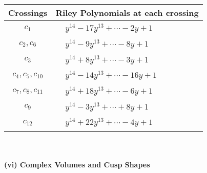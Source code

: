 \documentclass[1p]{elsarticle_modified}
\theoremstyle{definition}
\begin{document}
\begin{tabular}{m{50pt}|m{274pt}}
Crossings & \hspace{64pt}Riley Polynomials at each crossing \\
\hline $$\begin{aligned}c_{1}\end{aligned}$$&$\begin{aligned}
&y^{14}-17 y^{13}+\cdots-2 y+1
\end{aligned}$\\
\hline $$\begin{aligned}c_{2},c_{6}\end{aligned}$$&$\begin{aligned}
&y^{14}-9 y^{13}+\cdots-8 y+1
\end{aligned}$\\
\hline $$\begin{aligned}c_{3}\end{aligned}$$&$\begin{aligned}
&y^{14}+8 y^{13}+\cdots-3 y+1
\end{aligned}$\\
\hline $$\begin{aligned}c_{4},c_{5},c_{10}\end{aligned}$$&$\begin{aligned}
&y^{14}-14 y^{13}+\cdots-16 y+1
\end{aligned}$\\
\hline $$\begin{aligned}c_{7},c_{8},c_{11}\end{aligned}$$&$\begin{aligned}
&y^{14}+18 y^{13}+\cdots-6 y+1
\end{aligned}$\\
\hline $$\begin{aligned}c_{9}\end{aligned}$$&$\begin{aligned}
&y^{14}-3 y^{13}+\cdots+8 y+1
\end{aligned}$\\
\hline $$\begin{aligned}c_{12}\end{aligned}$$&$\begin{aligned}
&y^{14}+22 y^{13}+\cdots-4 y+1
\end{aligned}$\\
\hline
\end{tabular}\\~\\
\newpage\flushleft \textbf{(vi) Complex Volumes and Cusp Shapes}
\end{document}
